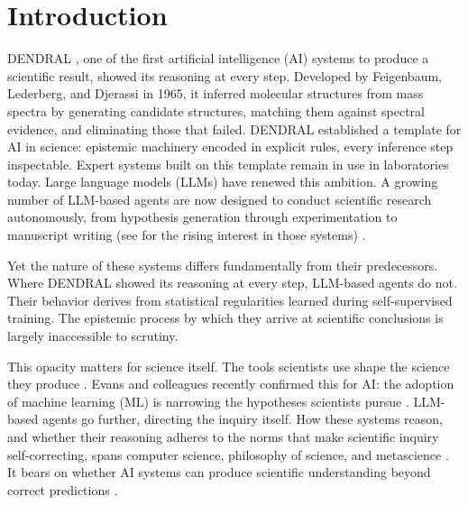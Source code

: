 \section{Introduction}

DENDRAL \autocite{lindsay1993dendral}, one of the first artificial intelligence (AI) systems to produce a scientific result, showed its reasoning at every step. Developed by Feigenbaum, Lederberg, and Djerassi in 1965, it inferred molecular structures from mass spectra by generating candidate structures, matching them against spectral evidence, and eliminating those that failed. DENDRAL established a template for AI in science: epistemic machinery encoded in explicit rules, every inference step inspectable. Expert systems built on this template remain in use in laboratories today. Large language models (LLMs) have renewed this ambition. A growing number of LLM-based agents are now designed to conduct scientific research autonomously, from hypothesis generation through experimentation to manuscript writing (see  for the rising interest in those systems) \autocite{alampara2026general,lu2026towards,Boiko2023autonomous,MBran2024augmenting,ghafarollahi2025sciagents,novikov2025alphaevolve0,miret2025enabling,mandal2025evaluating}.

Yet the nature of these systems differs fundamentally from their predecessors. Where DENDRAL showed its reasoning at every step, LLM-based agents do not. Their behavior derives from statistical regularities learned during self-supervised training. The epistemic process by which they arrive at scientific conclusions is largely inaccessible to scrutiny.

This opacity matters for science itself. The tools scientists use shape the science they produce \autocite{culkin1967schoolman}. Evans and colleagues recently confirmed this for AI: the adoption of machine learning (ML) is narrowing the hypotheses scientists pursue \autocite{hao2026artificial}. LLM-based agents go further, directing the inquiry itself. How these systems reason, and whether their reasoning adheres to the norms that make scientific inquiry self-correcting, spans computer science, philosophy of science, and metascience \autocite{ioannidis2015meta,pittphilsci28744}. It bears on whether AI systems can produce scientific understanding beyond correct predictions \autocite{krenn2022understanding}.

